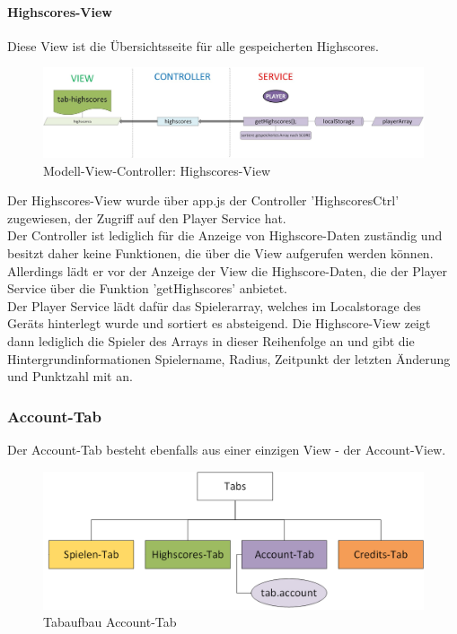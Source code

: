 \paragraph{Highscores-View}
%
%
Diese View ist die Übersichtsseite für alle gespeicherten Highscores.
%
%
\begin{figure}[h]
\centering
\includegraphics[width=1\textwidth]{ref/images/06-highscores-tab.png}
\caption[Modell-View-Controller: Highscores-View]{Modell-View-Controller: Highscores-View}
\label{fig:MVC:Highscores-View}
\end{figure}
%
%
Der Highscores-View wurde über app.js der Controller 'HighscoresCtrl' zugewiesen, der Zugriff auf den Player Service hat.
\\
Der Controller ist lediglich für die Anzeige von Highscore-Daten zuständig und besitzt daher keine Funktionen, die über die View aufgerufen werden können. Allerdings lädt er vor der Anzeige der View die Highscore-Daten, die der Player Service über die Funktion 'getHighscores' anbietet.
\\
Der Player Service lädt dafür das Spielerarray, welches im Localstorage des Geräts hinterlegt wurde und sortiert es absteigend. Die Highscore-View zeigt dann lediglich die Spieler des Arrays in dieser Reihenfolge an und gibt die Hintergrundinformationen Spielername, Radius, Zeitpunkt der letzten Änderung und Punktzahl mit an.
\subsubsection{Account-Tab}
Der Account-Tab besteht ebenfalls aus einer einzigen View - der Account-View.
\begin{figure}[h]
\centering
\includegraphics[width=1\textwidth]{ref/images/tabs_account.png}
\caption[Tabaufbau Account-Tab]{Tabaufbau Account-Tab}
\label{fig:Tabaufbau Account-Tab}
\end{figure}

